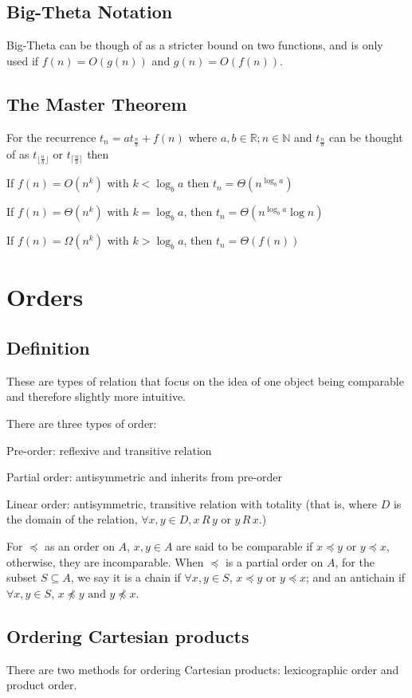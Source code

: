\documentclass[10pt]{article}
\begin{document}
\subsection{Big-Theta Notation}
Big-Theta can be though of as a stricter bound on two functions, and is only used if $f(n)=O(g(n))$ and $g(n)=O(f(n))$.
\subsection{The Master Theorem}
For the recurrence $t_n=at_{\frac nb}+f(n)$ where $a,b\in\mathbb{R};n\in\mathbb N$ and $t_\frac nb$ can be thought of as $t_{\lfloor\frac nb\rfloor}$ or $t_{\lceil\frac nb\rceil}$ then  
\begin{itemize*}
\item If $f(n)=O(n^k)$ with $k<\log_ba$ then $t_n=\Theta(n^{\log_b a})$
\item If $f(n)=\Theta(n^k)$ with $k=\log_ba$, then $t_n=\Theta(n^{\log_ba}\log n)$
\item If $f(n)=\Omega(n^k)$ with $k>\log_ba$, then $t_n=\Theta(f(n))$
\end{itemize*}
\section{Orders}
\subsection{Definition}
These are types of relation that focus on the idea of one object being comparable and therefore slightly more intuitive.

There are three types of order:
\begin{enumerate*}
\item Pre-order: reflexive and transitive relation
\item Partial order: antisymmetric and inherits from pre-order
\item Linear order: antisymmetric, transitive relation with totality (that is, where $D$ is the domain of the relation, $\forall x,y\in D, x\,R\,y\text{ or }y\,R\,x$.)
\end{enumerate*}
For $\preceq$ as an order on $A$, $x,y\in A$ are said to be comparable if $x\preceq y$ or $y\preceq x$, otherwise, they are incomparable.  When $\preceq$ is a partial order on $A$, for the subset $S\subseteq A$, we say it is a chain if $\forall x,y\in S$, $x\preceq y$ or $y\preceq x$; and an antichain if $\forall x,y\in S$, $x\not\preceq y\text{ and }y\not\preceq x$.
\subsection{Ordering Cartesian products}
There are two methods for ordering Cartesian products: lexicographic order and product order.
\end{document}
